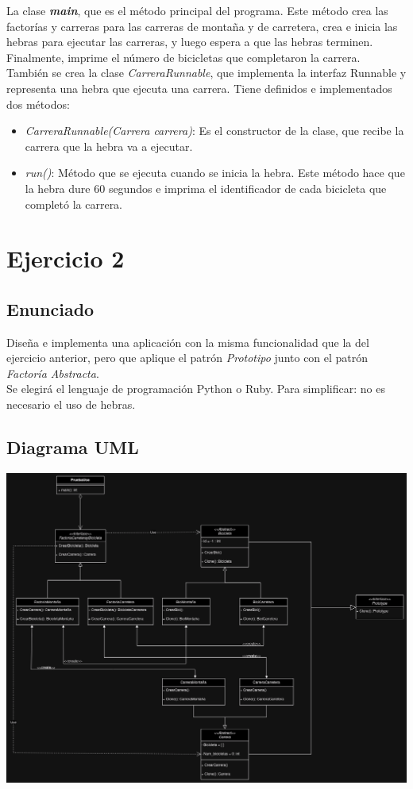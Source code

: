 \documentclass{article} %
\begin{document}
    \hspace*{1cm}La clase \textit{\textbf{main}}, que es el método principal del programa. Este método crea las factorías y 
    carreras para las carreras de montaña y de carretera, crea e inicia las hebras para ejecutar las carreras, y 
    luego espera a que las hebras terminen. Finalmente, imprime el número de bicicletas que completaron la carrera. \\
    También se crea la clase \textit{CarreraRunnable}, que implementa la interfaz Runnable y representa una hebra que ejecuta una carrera.
    Tiene definidos e implementados dos métodos:

    \begin{itemize}
        \item \textit{CarreraRunnable(Carrera carrera)}: Es el constructor de la clase, que recibe la carrera que la hebra va a ejecutar.
        \item \textit{run()}: Método que se ejecuta cuando se inicia la hebra. Este método hace que la hebra dure 60 segundos e imprima 
                el identificador de cada bicicleta que completó la carrera.
    \end{itemize}

    \section{Ejercicio 2}
    \subsection*{Enunciado}
    \hspace*{1cm}Diseña e implementa una aplicación con la misma funcionalidad que la del ejercicio anterior,
    pero que aplique el patrón \textit{Prototipo} junto con el patrón \textit{Factoría Abstracta}.\\
    \hspace*{1cm}Se elegirá el lenguaje de programación Python o Ruby. Para simplificar: no es necesario
    el uso de hebras.

    \subsection{Diagrama UML}
    \includegraphics[width=\textwidth]{imagenes/P1-E2.drawio.png}
\end{document}
